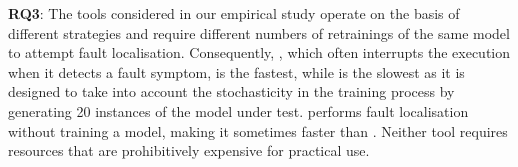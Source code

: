 \begin{tcolorbox}[colback = box-white]
  \textbf{RQ3}: The tools considered in our empirical study operate on the basis of different strategies and require different numbers of retrainings of the same model to attempt fault localisation. Consequently, \DD, which often interrupts the execution when it detects a fault symptom, is the fastest, while \dfd is the slowest as it is designed to take into account the stochasticity in the training process by generating 20 instances of the model under test. \NL 
 performs fault localisation without training a model, making it sometimes faster than \UM. Neither tool requires resources that are prohibitively expensive for practical use.
\end{tcolorbox}


%
%
